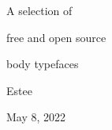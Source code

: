 
\line{}\baselineskip
\startcenter
{}

A selection of

\vskip 10pt
free and open source

\vskip 10pt
body typefaces

\baselineskip

\asterism

\baselineskip

Estee

\vskip 10pt
May 8, 2022

\stopcenter

\vfil\eject


